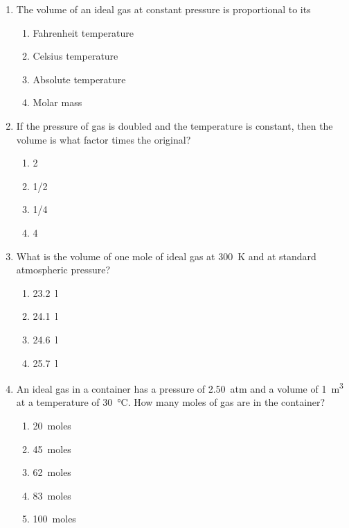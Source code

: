 \documentclass{../../../oss-apphys}
\begin{document}
\begin{multicols}{2}
\begin{enumerate}[leftmargin=18pt,start=24]
  \item The volume of an ideal gas at constant pressure is proportional to its
    \begin{enumerate}[noitemsep,topsep=0pt,leftmargin=18pt,label=(\Alph*)]
    \item Fahrenheit temperature
    \item Celsius temperature
    \item Absolute temperature
    \item Molar mass
    \end{enumerate}

  \item If the pressure of gas is doubled and the temperature is constant, then
    the volume is what factor times the original?
    \begin{enumerate}[noitemsep,topsep=0pt,leftmargin=18pt,label=(\Alph*)]
    \item 2
    \item 1/2
    \item 1/4
    \item 4
    \end{enumerate}

    \columnbreak
    
  \item What is the volume of one mole of ideal gas at \SI{300}{K} and at
    standard atmospheric pressure?
    \begin{enumerate}[noitemsep,topsep=0pt,leftmargin=18pt,label=(\Alph*)]
    \item\SI{23.2}{\litre}
    \item\SI{24.1}{\litre}
    \item\SI{24.6}{\litre}
    \item\SI{25.7}{\litre}
    \end{enumerate}

  \item An ideal gas in a container has a pressure of \SI{2.50}{atm} and a
    volume of \SI{1}{m^3} at a temperature of \SI{30}{\celsius}. How many moles
    of gas are in the container?
    \begin{enumerate}[noitemsep,topsep=0pt,leftmargin=18pt,label=(\Alph*)]
    \item\SI{20}{moles}
    \item\SI{45}{moles}
    \item\SI{62}{moles}
    \item\SI{83}{moles}
    \item\SI{100}{moles}
    \end{enumerate}

  \end{enumerate}
\end{multicols}
\end{document}
